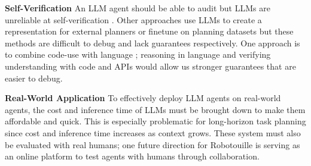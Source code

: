 \textbf{Self-Verification}
\label{dis:correct}
An LLM agent should be able to audit but LLMs are unreliable at self-verification \citep{valmeekam2023largelanguagemodelsreally}. Other approaches use LLMs to create a representation for external planners \citep{liu2023llmpempoweringlargelanguage,guan2023leveragingpretrainedlargelanguage} or finetune on planning datasets \citep{pallagani2022plansformergeneratingsymbolicplans,lehnert2024abetterplanningtransformers} but these methods are difficult to debug and lack guarantees respectively. One approach is to combine code-use with language \citep{wang2024executablecodeactionselicit}; reasoning in language and verifying understanding with code and APIs would allow us stronger guarantees that are easier to debug.

\textbf{Real-World Application}
To effectively deploy LLM agents on real-world agents, the cost and inference time of LLMs must be brought down to make them affordable and quick. This is especially problematic for long-horizon task planning since cost and inference time increases as context grows. These system must also be evaluated with real humans; one future direction for Robotouille is serving as an online platform to test agents with humans through collaboration.

